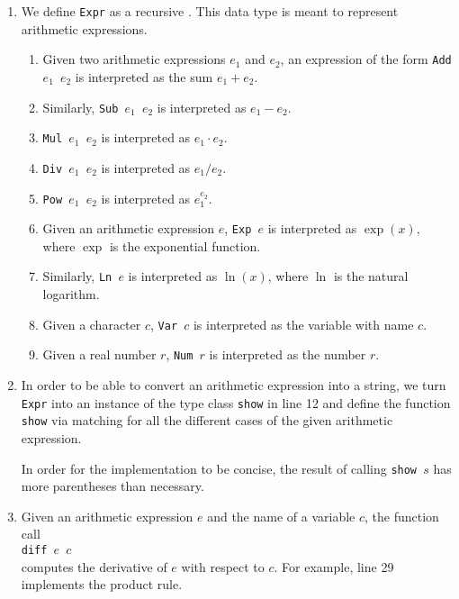 \begin{enumerate}
\item We define \texttt{Expr} as a recursive .  This data type is meant to represent
  arithmetic expressions.
  \begin{enumerate}
  \item Given two arithmetic expressions $e_1$ and $e_2$, an expression of the form \texttt{Add $e_1$ $e_2$} is
        interpreted as the sum $e_1 + e_2$. 
  \item Similarly, \texttt{Sub $e_1$ $e_2$} is interpreted as $e_1 - e_2$. 
  \item \texttt{Mul $e_1$ $e_2$} is interpreted as $e_1 \cdot e_2$. 
  \item \texttt{Div $e_1$ $e_2$} is interpreted as $e_1 / e_2$. 
  \item \texttt{Pow $e_1$ $e_2$} is interpreted as $e_1^{e_2}$. 
  \item Given an arithmetic expression $e$, \texttt{Exp $e$} is interpreted as $\exp(x)$, where
        $\exp$ is the exponential function.
  \item Similarly, \texttt{Ln $e$} is interpreted as $\ln(x)$, where
        $\ln$ is the natural logarithm.
  \item Given a character $c$, \texttt{Var $c$}  is interpreted as the variable with name $c$.
  \item Given a real number $r$, \texttt{Num $r$}  is interpreted as the number $r$.
  \end{enumerate}
\item In order to be able to convert an arithmetic expression into a string, we turn \texttt{Expr} into an
  instance of the type class \texttt{show} in line 12 and define the function \texttt{show} via matching for all the
  different cases of the given arithmetic expression.

  In order for the implementation to be concise, the result of calling \texttt{show $s$} has more parentheses
  than necessary.
\item Given an arithmetic expression $e$ and the name of a variable $c$, the function call
  \\[0.2cm]
  \hspace*{1.3cm}
  \texttt{diff $e$ $c$}
  \\[0.2cm]
  computes the derivative of $e$ with respect to $c$.  For example, line 29 implements the product rule.
\end{enumerate}


